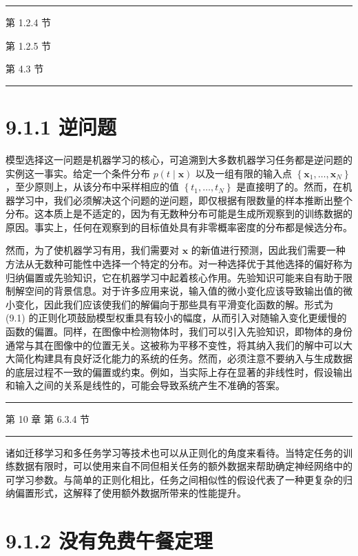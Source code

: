 \documentclass[10pt]{article}
\newcommand{\HRule}{\begin{center}\rule{0.9\linewidth}{0.2mm}\end{center}}
\begin{document}
\HRule

第 1.2.4 节

第 1.2.5 节

第 4.3 节

\HRule

\section*{9.1.1 逆问题}

模型选择这一问题是机器学习的核心，可追溯到大多数机器学习任务都是逆问题的实例这一事实。给定一个条件分布 \(p\left( {t \mid  \mathbf{x}}\right)\) 以及一组有限的输入点 \(\left\{  {{\mathbf{x}}_{1},\ldots ,{\mathbf{x}}_{N}}\right\}\) ，至少原则上，从该分布中采样相应的值 \(\left\{  {{t}_{1},\ldots ,{t}_{N}}\right\}\) 是直接明了的。然而，在机器学习中，我们必须解决这个问题的逆问题，即仅根据有限数量的样本推断出整个分布。这本质上是不适定的，因为有无数种分布可能是生成所观察到的训练数据的原因。事实上，任何在观察到的目标值处具有非零概率密度的分布都是候选分布。

然而，为了使机器学习有用，我们需要对 \(\mathbf{x}\) 的新值进行预测，因此我们需要一种方法从无数种可能性中选择一个特定的分布。对一种选择优于其他选择的偏好称为归纳偏置或先验知识，它在机器学习中起着核心作用。先验知识可能来自有助于限制解空间的背景信息。对于许多应用来说，输入值的微小变化应该导致输出值的微小变化，因此我们应该使我们的解偏向于那些具有平滑变化函数的解。形式为 (9.1) 的正则化项鼓励模型权重具有较小的幅度，从而引入对随输入变化更缓慢的函数的偏置。同样，在图像中检测物体时，我们可以引入先验知识，即物体的身份通常与其在图像中的位置无关。这被称为平移不变性，将其纳入我们的解中可以大大简化构建具有良好泛化能力的系统的任务。然而，必须注意不要纳入与生成数据的底层过程不一致的偏置或约束。例如，当实际上存在显著的非线性时，假设输出和输入之间的关系是线性的，可能会导致系统产生不准确的答案。

\HRule

第 10 章 第 6.3.4 节

\HRule

诸如迁移学习和多任务学习等技术也可以从正则化的角度来看待。当特定任务的训练数据有限时，可以使用来自不同但相关任务的额外数据来帮助确定神经网络中的可学习参数。与简单的正则化相比，任务之间相似性的假设代表了一种更复杂的归纳偏置形式，这解释了使用额外数据所带来的性能提升。

\section*{9.1.2 没有免费午餐定理}
\end{document}
